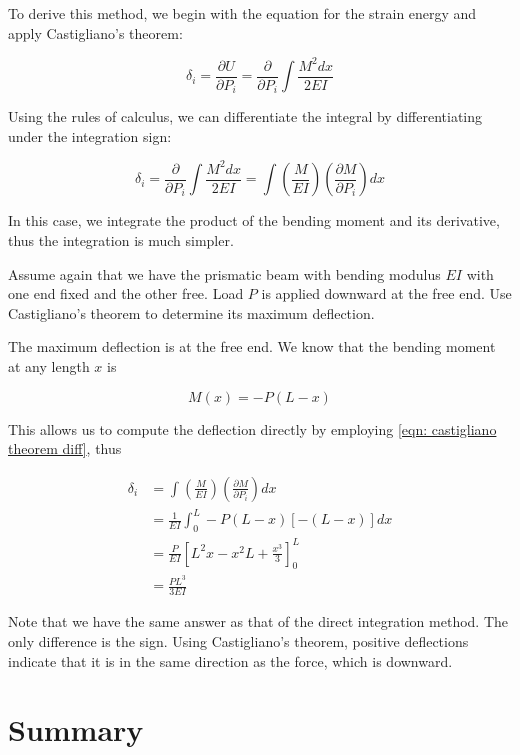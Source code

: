 \documentclass[
10pt,
a4paper,
openany,
svgnames,
]{book} %
\begin{document}
To derive this method, we begin with the equation for the strain energy and apply Castigliano’s theorem:

\[\delta _i = \frac{\partial U}{\partial P_i} = \frac{\partial }{\partial P_i}\int \frac{M^2dx}{2EI} \]

Using the rules of calculus, we can differentiate the integral by differentiating under the integration sign:

\begin{equation} \label{eqn: castigliano theorem diff}
  \delta _i = \frac{\partial }{\partial P_i}\int \frac{M^2dx}{2EI}  = \int \left( \frac{M}{EI} \right) \left( \frac{\partial M}{\partial P_i} \right)dx
\end{equation}

In this case, we integrate the product of the bending moment and its derivative, thus the integration is much simpler.

\begin{example}
Assume again that we have the prismatic beam with bending modulus $EI$ with one end fixed and the other free. Load $P$ is applied downward at the free end. Use Castigliano’s theorem to determine its maximum deflection.
\end{example}
\begin{solution}
The maximum deflection is at the free end. We know that the bending moment at any length $x$ is

\[M(x) =  - P(L - x)\]

This allows us to compute the deflection directly by employing \cref{eqn: castigliano theorem diff}, thus

\begin{align*}
  \delta_i &= \int \left( \frac{M}{EI} \right)\left( \frac{\partial M}{\partial P_i} \right)dx \\ 
              &= \frac{1}{EI}\int_0^L - P(L - x)[ - (L - x)]dx  \\ 
              &= \frac{P}{EI}\left[ L^2x - x^2L + \frac{x^3}{3} \right]_0^L \\ 
              &= \frac{PL^3}{3EI} 
\end{align*}	

Note that we have the same answer as that of the direct integration method. The only difference is the sign. Using Castigliano's theorem, positive deflections indicate that it is in the same direction as the force, which is downward.
\end{solution}

\section*{Summary}
\end{document}
